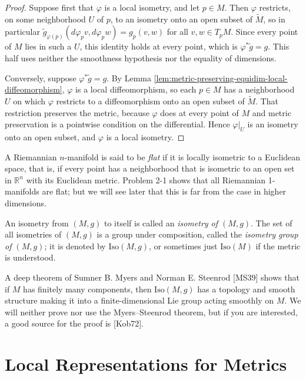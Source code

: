 \begin{proof}
\leanok
{}
Suppose first that $\varphi$ is a local isometry, and let $p \in M$. Then $\varphi$ restricts, on some neighborhood $U$ of $p$, to an isometry onto an open subset of $\widetilde{M}$, so in particular $\widetilde{g}_{\varphi(p)}(d\varphi_p v, d\varphi_p w) = g_p(v,w)$ for all $v,w \in T_pM$. Since every point of $M$ lies in such a $U$, this identity holds at every point, which is $\varphi^*\widetilde{g} = g$. This half uses neither the smoothness hypothesis nor the equality of dimensions.

Conversely, suppose $\varphi^* \widetilde{g} = g$. By Lemma \ref{lem:metric-preserving-equidim-local-diffeomorphism}, $\varphi$ is a local diffeomorphism, so each $p \in M$ has a neighborhood $U$ on which $\varphi$ restricts to a diffeomorphism onto an open subset of $\widetilde{M}$. That restriction preserves the metric, because $\varphi$ does at every point of $M$ and metric preservation is a pointwise condition on the differential. Hence $\varphi|_U$ is an isometry onto an open subset, and $\varphi$ is a local isometry.
\end{proof}

A Riemannian $n$-manifold is said to be \emph{flat} if it is locally isometric to a Euclidean space, that is, if every point has a neighborhood that is isometric to an open set in $\mathbb{R}^n$ with its Euclidean metric. Problem 2-1 shows that all Riemannian 1-manifolds are flat; but we will see later that this is far from the case in higher dimensions.

An isometry from $(M,g)$ to itself is called an \emph{isometry of $(M,g)$}. The set of all isometries of $(M,g)$ is a group under composition, called the \emph{isometry group of $(M,g)$}; it is denoted by $\text{Iso}(M,g)$, or sometimes just $\text{Iso}(M)$ if the metric is understood.

A deep theorem of Sumner B. Myers and Norman E. Steenrod [MS39] shows that if $M$ has finitely many components, then $\text{Iso}(M,g)$ has a topology and smooth structure making it into a finite-dimensional Lie group acting smoothly on $M$. We will neither prove nor use the Myers--Steenrod theorem, but if you are interested, a good source for the proof is [Kob72].

\section{Local Representations for Metrics}

